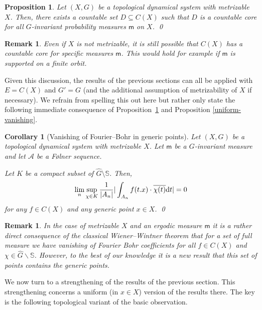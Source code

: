 \documentclass [14pt]{amsart}
\numberwithin{equation}{section}
\newcommand{\mm}{\mathsf{m}}
\newcommand{\dd}{\mbox{\rm d}}
\newcommand{\SSS}{\mathbb S}
\newtheorem{prop}[theorem]{Proposition}
\newtheorem{corollary}[theorem]{Corollary}
\newtheorem{remark}[theorem]{Remark}
\begin{document}
\begin{prop}\label{prop4.1} Let $(X,G)$ be a topological dynamical system with metrizable $X$. Then, there exists a countable set $D \subseteq C(X)$ such that $D$ is a countable core for all $G$-invariant probability measures $\mm$ on $X$. \qed
\end{prop}

\begin{remark} Even if  $X$ is not metrizable, it is still possible that $C(X)$ has a countable core for specific measures $\mm$. This would hold for example if $\mm$ is supported on a finite orbit.
\end{remark}

Given this discussion, the results of the previous sections can all be applied with  $E = C(X)$ and $G' = G$  (and the additional assumption of metrizability of $X$ if necessary). We refrain from spelling this out here but rather  only state the following immediate consequence of Proposition~\ref{prop4.1}  and   Proposition \ref{uniform-vanishing}.

\begin{corollary}[Vanishing of Fourier--Bohr in generic points]  Let $(X,G)$ be a  topological dynamical system with metrizable $X$. Let $\mm$ be a $G$-invariant measure and let $\mathcal{A}$ be a F\o lner sequence.

Let $K$ be a compact subset of $\widehat{G}\setminus \SSS$. Then,
$$\lim_n \sup_{\chi \in K} \frac{1}{|A_n|} |\int_{A_n} f(t.x) \cdot \overline{\chi(t)} \dd t| = 0$$
for any $f\in C(X)$ and  any generic point $x\in X$. \qed
\end{corollary}

\begin{remark} In the case of metrizable $X$ and an ergodic measure $\mm$  it is a  rather direct  consequence of the classical Wiener--Wintner theorem that for a set of full measure we have vanishing of Fourier Bohr coefficients for all $f\in C(X)$  and $\chi \in \widehat{G} \backslash \SSS$.  However, to the best of our knowledge  it is a  new result that this set of points contains the  generic points.
\end{remark}

We now turn to a strengthening of the results of the previous section. This strengthening concerns a uniform (in $x\in X$) version of the results there. The key is the following topological variant of the basic observation.
\end{document}
